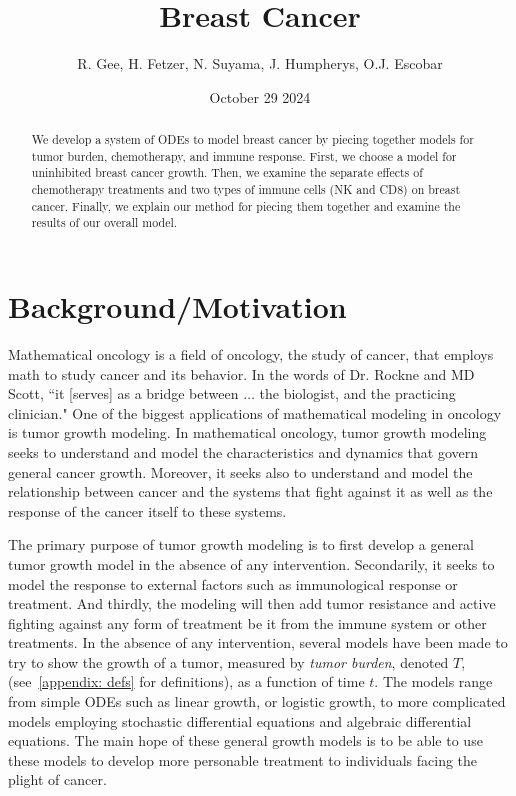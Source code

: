 \documentclass[11pt]{amsart}
\title{Breast Cancer}
\author{R. Gee, H. Fetzer, N. Suyama, J. Humpherys, O.J. Escobar}
\date{October 29 2024} %
\begin{document}
\maketitle %

\begin{abstract}
	We develop a system of ODEs to model breast cancer by piecing together models for tumor burden, chemotherapy, and immune response.
	First, we choose a model for uninhibited breast cancer growth.
	Then, we examine the separate effects of chemotherapy treatments and two types of immune cells (NK and CD8) on breast cancer.
	Finally, we explain our method for piecing them together and examine the results of our overall model.
\end{abstract}

\section{Background/Motivation}

Mathematical oncology is a field of oncology, the study of cancer, that employs math to study cancer and its behavior.
In the words of Dr. Rockne and MD Scott, ``it [serves] as a bridge between $\ldots$ the biologist, and the practicing clinician." \cite{IntroMathOnc}
One of the biggest applications of mathematical modeling in oncology is tumor growth modeling.
In mathematical oncology, tumor growth modeling seeks to understand and model the characteristics and dynamics that govern general cancer growth.
Moreover, it seeks also to understand and model the relationship between cancer and the systems that fight against it as well as the response of the cancer itself to these systems.


The primary %
 purpose of tumor growth modeling is to first develop a general tumor growth model in the absence of any intervention.
Secondarily, it seeks to model the response to external factors such as immunological response or treatment. 
And thirdly, the modeling will then add tumor resistance and active fighting against any form of treatment be it from the immune system or other treatments.
In the absence of any intervention, several models have been made to try to show the growth of a tumor, measured by \textit{tumor burden}, denoted $T$, (see\ \ref{appendix: defs} for definitions), as a function of time $t$.
The models range from simple ODEs such as linear growth, or logistic growth, to more complicated models employing stochastic differential equations and algebraic differential equations. 
The main hope of these general growth models is to be able to use these models to develop more personable treatment to individuals facing the plight of cancer.\ \cite{YinMoes}
\end{document}
